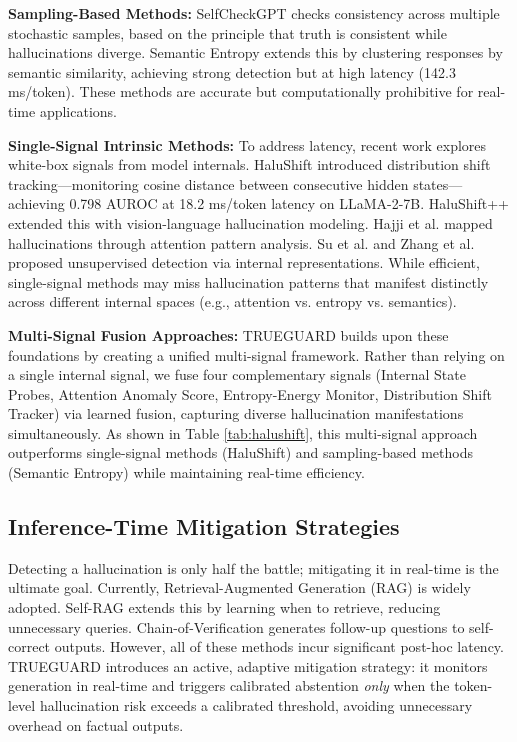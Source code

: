 \documentclass[conference]{IEEEtran}
\begin{document}
\textbf{Sampling-Based Methods:} SelfCheckGPT \cite{manakul2023selfcheckgpt} checks consistency across multiple stochastic samples, based on the principle that truth is consistent while hallucinations diverge. Semantic Entropy \cite{han2024semantic} extends this by clustering responses by semantic similarity, achieving strong detection but at high latency (142.3 ms/token). These methods are accurate but computationally prohibitive for real-time applications.

\textbf{Single-Signal Intrinsic Methods:} To address latency, recent work explores white-box signals from model internals. HaluShift \cite{dasgupta2025hallushift} introduced distribution shift tracking---monitoring cosine distance between consecutive hidden states---achieving 0.798 AUROC at 18.2 ms/token latency on LLaMA-2-7B. HaluShift++ \cite{nath2025hallushift} extended this with vision-language hallucination modeling. Hajji et al. \cite{hajji2025map} mapped hallucinations through attention pattern analysis. Su et al. \cite{su2024mind} and Zhang et al. \cite{zhang2025mhad} proposed unsupervised detection via internal representations. While efficient, single-signal methods may miss hallucination patterns that manifest distinctly across different internal spaces (e.g., attention vs. entropy vs. semantics).

\textbf{Multi-Signal Fusion Approaches:} TRUEGUARD builds upon these foundations by creating a unified multi-signal framework. Rather than relying on a single internal signal, we fuse four complementary signals (Internal State Probes, Attention Anomaly Score, Entropy-Energy Monitor, Distribution Shift Tracker) via learned fusion, capturing diverse hallucination manifestations simultaneously. As shown in Table \ref{tab:halushift}, this multi-signal approach outperforms single-signal methods (HaluShift) and sampling-based methods (Semantic Entropy) while maintaining real-time efficiency.

\subsection{Inference-Time Mitigation Strategies}
Detecting a hallucination is only half the battle; mitigating it in real-time is the ultimate goal. Currently, Retrieval-Augmented Generation (RAG) \cite{lewis2020retrieval} is widely adopted. Self-RAG \cite{asai2023self} extends this by learning when to retrieve, reducing unnecessary queries. Chain-of-Verification \cite{dhuliawala2024chain} generates follow-up questions to self-correct outputs. However, all of these methods incur significant post-hoc latency. TRUEGUARD introduces an active, adaptive mitigation strategy: it monitors generation in real-time and triggers calibrated abstention \cite{azaria2023internal} \textit{only} when the token-level hallucination risk exceeds a calibrated threshold, avoiding unnecessary overhead on factual outputs.
\end{document}
